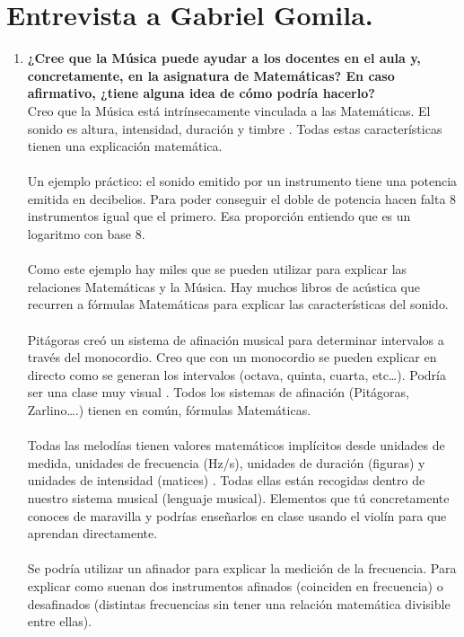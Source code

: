 \documentclass[a4paper, openright, 11pt, titlepage]{report}
\theoremstyle{definition}\newtheorem{defin}[propo]{Definition}
\theoremstyle{definition}\newtheorem{obser}[propo]{Remark}
\theoremstyle{definition}\newtheorem{ejem}[propo]{Ejemplo}
\theoremstyle{definition}\newtheorem{algoritmo}[propo]{Algoritmo}
\begin{document}
\section{Entrevista a Gabriel Gomila.}
\begin{enumerate}
    \item \textbf{¿Cree que la Música puede ayudar a los docentes en el aula y, concretamente, en la asignatura de Matemáticas? En caso afirmativo, ¿tiene alguna idea de cómo podría hacerlo?}\\
    Creo que la Música está intrínsecamente vinculada a las Matemáticas. El sonido es altura, intensidad, duración y timbre . Todas estas características tienen una explicación matemática.\\\\ 
    Un ejemplo práctico: el sonido emitido por un instrumento tiene una potencia emitida en decibelios. Para poder conseguir el doble de potencia hacen falta 8 instrumentos igual que el primero. Esa proporción entiendo que es un logaritmo con base 8.\\\\
    Como este ejemplo hay miles que se pueden utilizar para explicar las relaciones Matemáticas y la Música. Hay muchos libros de acústica que recurren a fórmulas Matemáticas para explicar las características del sonido.\\\\
    Pitágoras creó un sistema de afinación musical para determinar intervalos a través del monocordio. Creo que con un monocordio se pueden explicar en directo como se generan los intervalos (octava, quinta, cuarta, etc…). Podría ser una clase muy visual . 
    Todos los sistemas de afinación (Pitágoras, Zarlino….) tienen en común, fórmulas Matemáticas.\\\\
    Todas las melodías tienen valores matemáticos implícitos desde unidades de medida, unidades de frecuencia (Hz/s), unidades de duración (figuras) y unidades de intensidad (matices) . Todas ellas están recogidas dentro de nuestro sistema musical (lenguaje musical). Elementos que tú concretamente conoces de maravilla y podrías enseñarlos en clase usando el violín para que aprendan directamente.\\\\
    Se podría utilizar un afinador para explicar la medición de la frecuencia. Para explicar como suenan dos instrumentos afinados (coinciden en frecuencia) o desafinados (distintas frecuencias sin tener una relación matemática divisible entre ellas).

\end{enumerate}
\end{document}
